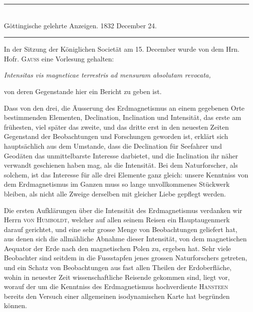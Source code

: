 \clearpage
{}
\GaussVSourceUnnumbered
{}
\begin{center}
\rule{.70\linewidth}{.4pt}\\[.7\baselineskip]
Göttingische gelehrte Anzeigen. 1832 December 24.\\[.7\baselineskip]
\rule{.70\linewidth}{.4pt}
\end{center}

In der Sitzung der Königlichen Societät am 15. December wurde von dem
Hrn. Hofr. \textsc{Gauss} eine Vorlesung gehalten:
\begin{center}
\textit{Intensitas vis magneticae terrestris ad mensuram absolutam revocata,}
\end{center}
\noindent
von deren Gegenstande hier ein Bericht zu geben ist.

Dass von den drei, die Äusserung des Erdmagnetismus an einem gegebenen Orte
bestimmenden Elementen, Declination, Inclination und Intensität, das erste am
frühesten, viel später das zweite, und das dritte erst in den neuesten Zeiten
Gegenstand der Beobachtungen und Forschungen geworden ist, erklärt sich
hauptsächlich aus dem Umstande, dass die Declination für Seefahrer und Geodäten
das unmittelbarste Interesse darbietet, und die Inclination ihr näher verwandt
geschienen haben mag, als die Intensität. Bei dem Naturforscher, als solchem,
ist das Interesse für alle drei Elemente ganz gleich: unsere Kenntniss von dem
Erdmagnetismus im Ganzen muss so lange unvollkommenes Stückwerk bleiben, als
nicht alle Zweige derselben mit gleicher Liebe gepflegt werden.

Die ersten Aufklärungen über die Intensität des Erdmagnetismus verdanken wir
Herrn \textsc{von Humboldt}, welcher auf allen seinem Reisen ein Hauptaugenmerk
darauf gerichtet, und eine sehr grosse Menge von Beobachtungen geliefert hat,
aus denen sich die allmähliche Abnahme dieser Intensität, von dem magnetischen
Aequator der Erde nach den magnetischen Polen zu, ergeben hat. Sehr
\clearpage
{}
\noindent
viele Beobachter sind seitdem in die Fussstapfen jenes grossen Naturforschers
getreten, und ein Schatz von Beobachtungen aus fast allen Theilen der
Erdoberfläche, wohin in neuester Zeit wissenschaftliche Reisende gekommen sind,
liegt vor, worauf der um die Kenntniss des Erdmagnetismus hochverdiente
\textsc{Hansteen} bereits den Versuch einer allgemeinen isodynamischen Karte
hat begründen können.

